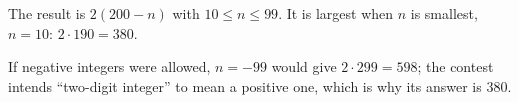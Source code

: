The result is $2(200-n)$ with $10\le n\le99$. It is largest when $n$ is smallest, $n=10$: $2\cdot190=\boxed{380}$.

If negative integers were allowed, $n=-99$ would give $2\cdot299=598$; the contest intends ``two-digit integer'' to mean a positive one, which is why its answer is $380$.
